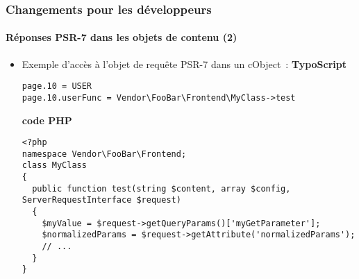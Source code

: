 %

\begin{frame}[fragile]
	\frametitle{Changements pour les développeurs}
	\framesubtitle{Réponses PSR-7 dans les objets de contenu (2)}

	\lstset{basicstyle=\tiny\ttfamily}

	\begin{itemize}
		\item Exemple d'accès à l'objet de requête PSR-7 dans un cObject~:\newline
			\smaller\textbf{TypoScript}\normalsize
\begin{lstlisting}
page.10 = USER
page.10.userFunc = Vendor\FooBar\Frontend\MyClass->test
\end{lstlisting}
			\smaller\textbf{code PHP}\normalsize
\begin{lstlisting}
<?php
namespace Vendor\FooBar\Frontend;
class MyClass
{
  public function test(string $content, array $config, ServerRequestInterface $request)
  {
    $myValue = $request->getQueryParams()['myGetParameter'];
    $normalizedParams = $request->getAttribute('normalizedParams');
    // ...
  }
}
\end{lstlisting}

	\end{itemize}
\end{frame}

